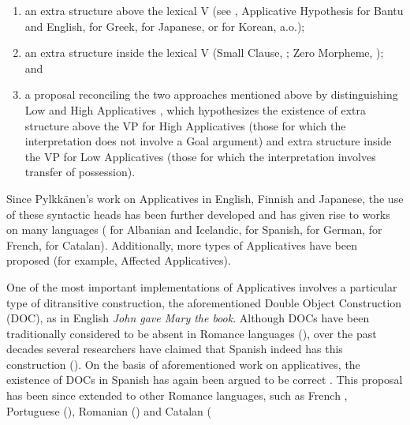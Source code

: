 \documentclass[output=paper,modfonts,nonflat,colorlinks,citecolor=brown]{langsci/langscibook}
\begin{document}
\begin{enumerate}
\item 
an extra structure above the lexical V (see \citealt{Baker1977, Baker1988},  Applicative Hypothesis for Bantu and English, \citet{Anagnostopoulou2003} for Greek, \citet{MiyagawaTsujioka2004} for Japanese, or \citet{MiyagawaJung2004} for Korean, a.o.); 

\item 
 an extra structure inside the lexical V (Small Clause, \citealt{Kayne1984}; Zero Morpheme, \citealt{Pesetsky1995}); and

\item 
a proposal reconciling the two approaches mentioned above by distinguishing Low and High Applicatives \citep{Pylkkänen2002}, which hypothesizes the existence of extra structure above the VP for High Applicatives (those for which the interpretation does not involve a Goal argument) and extra structure inside the VP for Low Applicatives (those for which the interpretation involves transfer of possession). 

\end{enumerate}
 
{Since Pylkkänen's work on Applicatives in English, Finnish and Japanese, the use of these syntactic heads has been further developed and has given rise to works on many languages (\citealt{McGinnis2001} for Albanian and Icelandic, \citealt{Cuervo2003} for Spanish, \citealt{McIntyre2006} for German, \citealt{Fournier2010} for French, \citealt{Pineda2013, Pineda2016, PinedaPress} for Catalan). Additionally, more types of Applicatives have been proposed (for example,  Affected Applicatives).~}


 
{One of the most important implementations of Applicatives involves a particular type of ditransitive construction, the aforementioned Double Object Construction (DOC), as in English} {\textit{John gave Mary the book}}{. Although DOCs have been traditionally considered to be absent in Romance languages (\citealt{Kayne1984,HolmbergPlatzack1995}), over the past decades several researchers have claimed that Spanish indeed has this construction (\citealt{Masullo1992,Demonte1995,Romero1997,Bleam2003}). On the basis of  aforementioned work on applicatives, the existence of DOCs in Spanish has again been argued to be correct \citep{Cuervo2003}. This proposal has been since extended to other Romance languages, such as French \citep{Fournier2010}, Portuguese (\citealt{TorresMoraisSalles2010}), Romanian (\citealt{DiaconescuRivero2007}) and Catalan (\citealt{Pineda2013, Pineda2016, PinedaPress}} 
\end{document}
